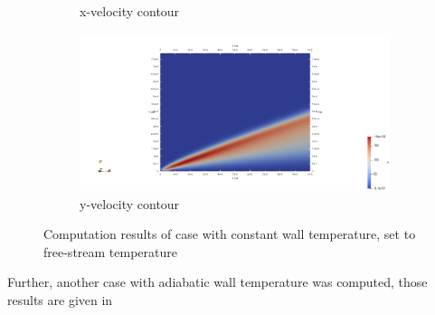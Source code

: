 \documentclass[conf]{new-aiaa}
\begin{document}
\begin{figure}[!htb]
\begin{subfigure}{0.45\textwidth}
        \caption{x-velocity contour}
    \end{subfigure}
    \hfill
    \begin{subfigure}{0.45\textwidth}
        \includegraphics[width=\textwidth]{supportingFiles/solution_files_flatplate_constant_Twall/v_velocity.png}
        \caption{y-velocity contour}
    \end{subfigure}
    \caption{Computation results of case with constant wall temperature, set to free-stream temperature}
    \label{results_Tc}
\end{figure}

\par Further, another case with adiabatic wall temperature was computed, those results are given in
\end{document}
